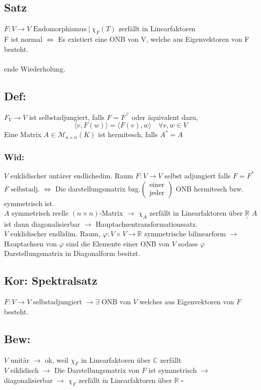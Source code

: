 \documentclass[titlepage,12pt,a4paper,ngerman]{report}
\newenvironment{bew}{\subsection{Bew:}}{\hfill$\square$}
\newcommand{\Bew}[1]{\begin{bew}#1\end{bew}}
\newcommand{\tx}[1]{\textrm{#1}}
\newcommand{\ska}[2]{\langle #1 , #2 \rangle}
\newcommand{\enph}{F: V \to V \textrm{ Endomorphismus}}
\begin{document}
\subsection{Satz} $ \enph\  | \  \chi_F(T) $ zerfällt in Linearfaktoren\\
F ist normal $ \Leftrightarrow $ Es existiert eine ONB von V, welche aus Eigenvektoren von F besteht.\\\\
ende Wiederholung.

\subsection{Def:}$ F_V\to V $ ist selbstadjungiert, falls $ F = F^\top $ oder äquivalent dazu,
$$\ska{v}{F(w)} = \ska{F(v)}{w} \quad \forall v,w \in V$$
Eine Matrix $ A \in \mathcal{M}_{n\times n} (K) $ ist hermitesch, falls $ A^* = A $
\subsubsection{Wid:}
$V$ euklidischer untärer endlichedim. Raum $F: V \to V$ selbst adjungiert falls $F = F^*$\\ 
$F \tx{ selbstadj. } \Leftrightarrow$ Die darstellungsmatrix bzg.$\begin{pmatrix}
\tx{einer} \\ \tx{jeder}
\end{pmatrix}$ ONB hermitesch bzw. symmetrisch ist.\\
$A$ symmetrisch reelle $(n \times n)$-Matrix $\rightarrow$ $\chi_A$ zerfällt in Linearfaktoren über $\underline{\underline{\mathbb R}}$
$A$ ist dann diagonalisierbar $\rightarrow$ Hauptachsentransformationssatz.\\ 
$V \tx{ euklidischer endlidim. Raum}$, $\varphi: V \times V \to \mathbb R \tx{ symmetrische bilinearform}$
$\rightarrow$ Hauptachsen von $\varphi$ sind die Elemente einer ONB von $V$ sodass $\varphi$ Darstellungsmatrix in Diagonalform besitzt.
\subsection{Kor: Spektralsatz}
$F:V\to V$ selbstadjungiert $\rightarrow \exists \tx{ ONB von } V$ welches aus Eigenvektoren von $F$ besteht.
\Bew{$V$ unitär $\rightarrow$ ok, weil $\chi_F$ in Linearfaktoren über $\mathbb C$ zerfällt\\
	$V$ eiklidisch $\rightarrow$ Die Darstellungsmatrix von $F$ ist symmetrisch $\rightarrow$ diagonalisierbar $\rightarrow$ $\chi_F$ zerfällt in Linearfaktoren über $\mathbb R$ 
}
\end{document}
